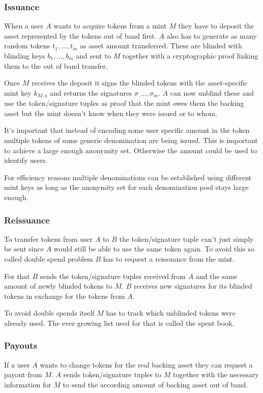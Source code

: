 \documentclass[10pt,a4paper,twocolumn]{article}
\begin{document}
\subsubsection{Issuance}
When a user $A$ wants to acquire tokens from a mint $M$ they have to deposit the asset represented by the tokens out of band first. $A$ also has to generate as many random tokens $t_1, \dots, t_m$ as asset amount transferred. These are blinded with blinding keys $b_1, \dots, b_m$ and sent to $M$ together with a cryptographic proof linking them to the out of band transfer.

Once $M$ receives the deposit it signs the blinded tokens with the asset-specific mint key $k_{M, a}$ and returns the signatures $\sigma_, \dots, \sigma_m$.
$A$ can now unblind these and use the token/signature tuples as proof that the mint owes them the backing asset but the mint doesn't know when they were issued or to whom.

It's important that instead of encoding some user specific amount in the token multiple tokens of some generic denomination are being issued. This is important to achieve a large enough anonymity set. Otherwise the amount could be used to identify users.

For efficiency reasons multiple denominations can be established using different mint keys as long as the anonymity set for each denomination pool stays large enough.

\subsubsection{Reissuance}
To transfer tokens from user $A$ to $B$ the token/signature tuple can't just simply be sent since $A$ would still be able to use the same token again. To avoid this so called double spend problem $B$ has to request a reissuance from the mint.

For that $B$ sends the token/signature tuples received from $A$ and the same amount of newly blinded tokens to $M$.
$B$ receives new signatures for its blinded tokens in exchange for the tokens from $A$.

To avoid double spends itself $M$ has to track which unblinded tokens were already used. The ever growing list used for that is called the spent book.

\subsubsection{Payouts}
If a user $A$ wants to change tokens for the real backing asset they can request a payout from $M$. $A$ sends token/signature tuples to $M$ together with the necessary information for $M$ to send the according amount of backing asset out of band.
\end{document}
